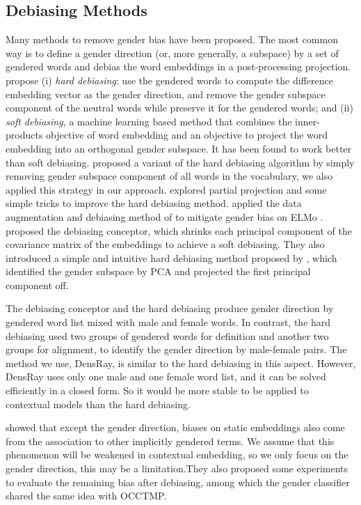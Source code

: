 \subsection{Debiasing Methods}
Many methods to remove gender bias have been proposed. The most common way is to define a gender direction (or, more generally, a subspace) by a set of gendered words and debias the word embeddings in a post-processing projection.  propose (i) \emph{hard debiasing}: use the gendered words to compute the difference embedding vector as the gender direction, and remove the gender subspace component of the neutral words while preserve it for the gendered words; and (ii) \emph{soft debiasing}, a machine learning based method that combines the inner-products objective of word embedding and an objective to project the word embedding into an orthogonal gender subspace. It has been found to work better than soft debiasing.  proposed a variant of the hard debiasing algorithm by simply removing gender subspace component of all words in the vocabulary, we also applied this strategy in our approach.  explored partial projection and some simple tricks to improve the hard debiasing method.
 applied the data augmentation and debiasing method of  to mitigate gender bias on ELMo  \cite{Peters:2018}.  proposed the debiasing conceptor, which shrinks each principal component of the covariance matrix of the embeddings to achieve a soft debiasing. They also introduced a simple and intuitive hard debiasing method proposed by \cite{mu2018all}, which identified the gender subspace by PCA and projected the first principal component off.  

The debiasing conceptor and the  hard debiasing produce gender direction by gendered word list mixed with male and female words. In contrast, the  hard debiasing used two groups of gendered words for definition and another two groups for alignment, to identify the gender direction by male-female pairs. The method we use, DensRay, is similar to the  hard debiasing in this aspect. However, DensRay uses only one male and one female word list, and it can be solved efficiently in a closed form. So it would be more stable to be applied to contextual models than the  hard debiasing. 
 
 showed that except the gender direction, biases on static embeddings also come from the association to other implicitly gendered terms. We assume that this phenomenon will be weakened in contextual embedding, so we only focus on the gender direction, this may be a limitation.They also proposed some experiments to evaluate the remaining bias after debiasing, among which the gender classifier shared the same idea with OCCTMP.



